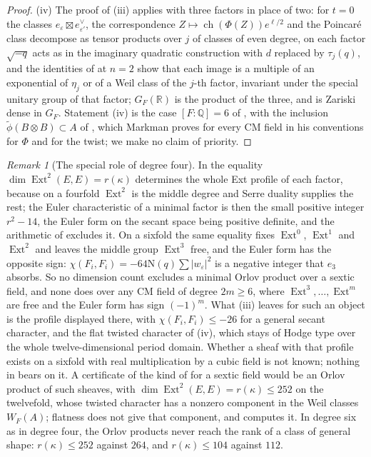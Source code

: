\documentclass[11pt,reqno]{amsart}
\theoremstyle{plain}
\theoremstyle{definition}
\theoremstyle{remark}
\newtheorem{remark}[theorem]{Remark}
\newcommand{\QQ}{\mathbb{Q}}
\newcommand{\RR}{\mathbb{R}}
\newcommand{\Nm}{\mathrm{N}}             %
\DeclareMathOperator{\ch}{ch}
\DeclareMathOperator{\Ext}{Ext}
\begin{document}
\begin{proof}
(iv) The proof of (iii) applies with three
factors in place of two: for $t=0$ the classes $e_{\varepsilon}\boxtimes
e_{\varepsilon'}^{\vee}$, the correspondence $Z\mapsto\ch(\Phi(Z))e^{\ell/2}$
and the Poincar\'e class decompose as tensor products over $j$ of classes of
even degree, on each factor $\sqrt{-q}$ acts as in the imaginary quadratic
construction with $d$ replaced by $\tau_{j}(q)$, and the identities of
 at $n=2$ show that each image is a multiple of an
exponential of $\eta_{j}$ or of a Weil class of the $j$-th factor, invariant
under the special unitary group of that factor; $G_{F}(\RR)$ is the product of
the three, and is Zariski dense in $G_{F}$. Statement (iv) is the case
$[F:\QQ]=6$ of \cite[Proposition~10.2.1(1)]{Mar25c}, with the inclusion
$\widetilde\phi(B\otimes B)\subset A$ of \cite[p.~33]{Mar25c}, which Markman
proves for every CM field in his conventions for $\Phi$ and for the twist; we
make no claim of priority.
\end{proof}

\begin{remark}[The special role of degree four]
\label{rem:sexticparity}
In  the equality $\dim\Ext^{2}(E,E)=r(\kappa)$
determines the whole Ext profile of each factor, because on a fourfold
$\Ext^{2}$ is the middle degree and Serre duality supplies the rest; the Euler
characteristic of a minimal factor is then the small positive integer
$r^{2}-14$, the Euler form on the secant space being positive definite, and
the arithmetic of  excludes it. On a sixfold the same
equality fixes $\Ext^{0}$, $\Ext^{1}$ and $\Ext^{2}$ and leaves the middle
group $\Ext^{3}$ free, and the Euler form has the opposite sign:
$\chi(F_{i},F_{i})=-64\Nm(q)\sum|w_{\varepsilon}|^{2}$ is a negative integer
that $e_{3}$ absorbs. So no dimension count excludes a minimal Orlov product
over a sextic field, and none does over any CM field of degree $2m\ge6$,
where $\Ext^{3},\dots,\Ext^{m}$ are free and the Euler form has sign
$(-1)^{m}$. What (iii) leaves for such an object is the
profile displayed there, with $\chi(F_{i},F_{i})\le-26$ for a general secant
character, and the flat twisted character of (iv), which stays of Hodge type
over the whole twelve-dimensional period domain. Whether a sheaf with that
profile exists on a sixfold with real multiplication by a cubic field is not
known; nothing in  bears on it. A certificate
of the kind of  for a sextic field would be an Orlov
product of such sheaves, with $\dim\Ext^{2}(E,E)=r(\kappa)\le252$ on the
twelvefold, whose twisted character has a nonzero component in the Weil
classes $W_{F}(A)$; flatness does not give that component, and
 computes it. In degree six as in degree four, the Orlov
products never reach the rank of a class of general shape: $r(\kappa)\le252$
against $264$, and $r(\kappa)\le104$ against $112$.
\end{remark}
\end{document}
